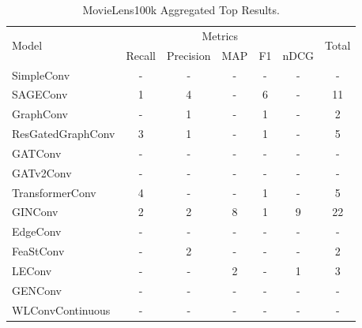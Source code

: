 \documentclass{scrartcl}
\begin{document}
\begin{appendices}
\begin{table}[htbp]
    \centering 
    \begin{tabular}{|l|*{5}{c|}c|}
    \hline
    \multirow{2}{*}{Model} & \multicolumn{5}{c|}{Metrics} & \multirow{2}{*}{Total} \\
    \hhline{~*{5}{|-}|~|}
                             & Recall & Precision & MAP & F1 & nDCG & \\ \hline
    \rowcolor[gray]{0.9} SimpleConv               & - & - & - & - & - & - \\ 
    SAGEConv                 & 1 & 4 & - & 6 & - & 11 \\ 
    \rowcolor[gray]{0.9} GraphConv                & - & 1 & - & 1 & - & 2 \\ 
    ResGatedGraphConv        & 3 & 1 & - & 1 & - & 5 \\ 
    \rowcolor[gray]{0.9} GATConv                  & - & - & - & - & - & - \\ 
    GATv2Conv                & - & - & - & - & - & - \\ 
    \rowcolor[gray]{0.9} TransformerConv          & 4 & - & - & 1 & - & 5 \\ 
    GINConv                  & 2 & 2 & 8 & 1 & 9 & 22 \\ 
    \rowcolor[gray]{0.9} EdgeConv                 & - & - & - & - & - & - \\ 
    FeaStConv                & - & 2 & - & - & - & 2 \\ 
    \rowcolor[gray]{0.9} LEConv                   & - & - & 2 & - & 1 & 3 \\ 
    GENConv                  & - & - & - & - & - & - \\ 
    \rowcolor[gray]{0.9} WLConvContinuous         & - & - & - & - & - & - \\ \hline
    \end{tabular}
    \caption{MovieLens100k Aggregated Top Results.}
    \label{tab:aggregated}
\end{table}

\end{appendices}

\clearpage





\end{document}
